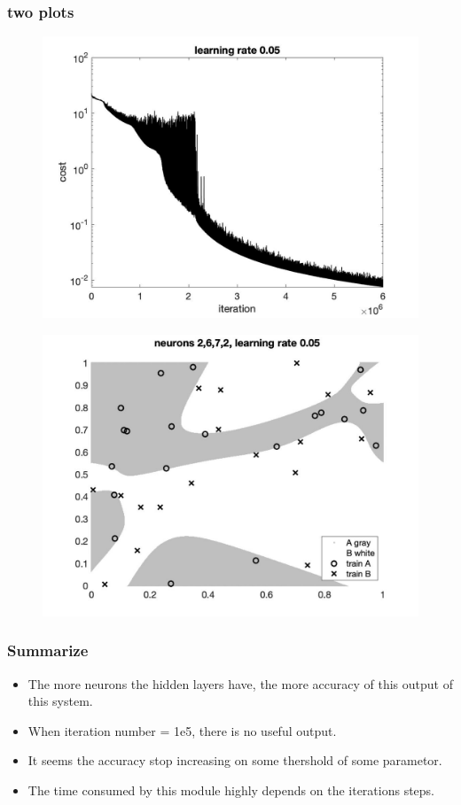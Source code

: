 \documentclass[11pt,fleqn]{exam}
\begin{document}
\subsubsection*{two plots}
\begin{figure}[H]
  	\centering
  	\includegraphics[width=1\textwidth]{q11.jpg}
\end{figure}	

\begin{figure}[H]
  	\centering
  	\includegraphics[width=1\textwidth]{q12.jpg}
\end{figure}	

\subsubsection*{Summarize}
\begin{itemize}
\item The more neurons the hidden layers have, the more accuracy of this output of this system.
\item When iteration number = 1e5, there is no useful output.
\item It seems the accuracy stop increasing on some thershold of some parametor.
\item The time consumed by this module highly depends on the iterations steps.
\end{itemize}
\end{document}
